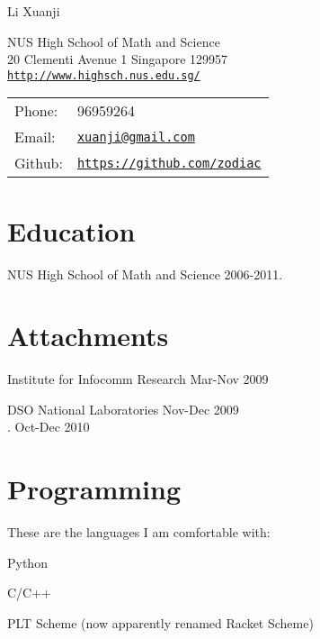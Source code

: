 \documentclass[letterpaper]{article}
\def\name{Li Xuanji}
\renewenvironment{itemize}{
  \begin{list}{}{
    \setlength{\leftmargin}{1.5em}
  }
}{
  \end{list}
}
\begin{document}
{\huge \name}




\vspace{0.25in}


\begin{minipage}{0.45\linewidth}
  NUS High School of Math and Science \\
  20 Clementi Avenue 1 Singapore 129957 \\
  \href{http://www.highsch.nus.edu.sg/}{\tt http://www.highsch.nus.edu.sg/}
\end{minipage}
\begin{minipage}{0.45\linewidth}
  \begin{tabular}{ll}
    Phone: & 96959264 \\
    Email: & \href{mailto:xuanji@gmail.com}{\tt xuanji@gmail.com} \\
    Github: & \href{https://github.com/zodiac}{\tt https://github.com/zodiac} \\
  \end{tabular}
\end{minipage}


\section*{Education}


\begin{itemize}
  \item NUS High School of Math and Science \hfill 2006-2011.
\end{itemize}


\section*{Attachments}


\begin{itemize}
  \item Institute for Infocomm Research \hfill Mar-Nov 2009
  \item DSO National Laboratories \hfill Nov-Dec 2009 \\
. \hfill Oct-Dec 2010
\end{itemize}


\section*{Programming}
These are the languages I am comfortable with:
  \begin{itemize}
  \item{Python}
  \item{C/C++}
  \item{PLT Scheme (now apparently renamed Racket Scheme)}
  \end{itemize}
\end{document}
